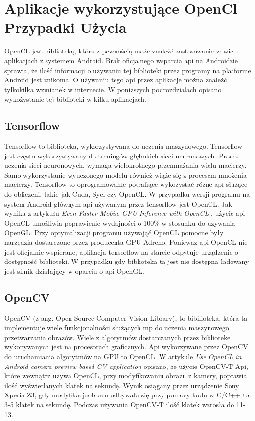 \section[Aplikacje wykorzystujące OpenCl Przypadki Użycia]{Aplikacje wykorzystujące OpenCl Przypadki Użycia}
OpenCL jest biblioteką, która z pewnością może znaleźć zastosowanie w wielu aplikacjach z systemem Android. Brak oficjalnego wsparcia api na Androidzie sprawia, że ilość informacji o używaniu tej biblioteki przez programy na platforme Android jest znikoma. O używaniu tego api przez aplikacje można znaleźć tylkokilka wzmianek w internecie. W poniższych podrozdzialach opisano wykożystanie tej biblioteki w kilku aplikacjach.
\subsection[Tensorflow]{Tensorflow}
Tensorflow to biblioteka, wykorzystywana do uczenia maszynowego. Tensorflow jest często wykorzystywany do treningów głębokich sieci neuronowych. Proces uczenia sieci neuronowych, wymaga wielokrotnego przemnażania wielu macierzy. Samo wykorzystanie wyuczonego modelu również wiąże się z procesem mnożenia macierzy. Tensorflow to oprogramowanie potrafiące wykożystać różne api służące do obliczeni, takie jak Cuda, Sycl czy OpenCL. W przypadku wersji programu na system Android głównym api używanym przez tensorflow jest OpenCL. Jak wynika z artykułu \emph{Even Faster Mobile GPU Inference with OpenCL} \cite{Tensor}, użycie api OpenCL umożliwia poprawienie wydajności o 100\% w stosunku do uzywania OpenGL. Przy optymalizacji programu używająć OpenCL pomocne były narzędzia dostarczone przez producenta GPU Adreno. Poniewaz api OpenCL nie jest oficjalnie wspierane, aplikacja tensorflow na starcie odpytuje urządzenie o dostępność biblioteki. W przypadku gdy biblioteka ta jest nie dostępna ładowany jest silnik działający w oparciu o api OpenGL.
\subsection[OpenCV]{OpenCV}
OpenCV (z ang. Open Source Computer Vision Library), to bibilioteka, która ta implementuje wiele funkcjonalności służących mp do uczenia maszynowego i przetwarzania obrazów. Wiele z algorytmów dostarczanych przez biblioteke wykonywanych jest na procesorach graficznych. Api wykorzywane przez OpenCV do uruchamiania algorytmów na GPU to OpenCL. W artykule \emph{Use OpenCL in Android camera preview based CV application} \cite{OpenCV} opisano, że użycie OpenCV-T Api, które wewnątrz używa OpenCL, przy modyfikowaniu obrazu z kamery, poprawia ilość wyświetlanych klatek na sekundę. Wynik osiągany przez urządzenie Sony Xperia Z3, gdy modyfikacjaobrazu odbywała się przy pomocy kodu w C/C++ to 3-5 klatek na sekundę. Podczas używania OpenCV-T ilość klatek wzrosła do 11-13.
